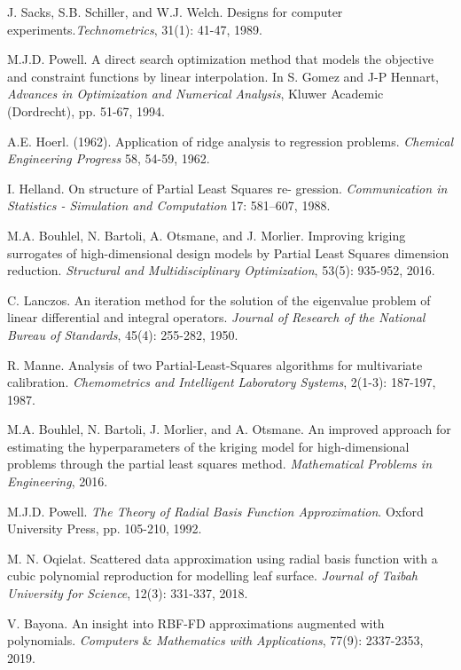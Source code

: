 J. Sacks, S.B. Schiller, and W.J. Welch. Designs for 
computer experiments.\textit{Technometrics}, 
31(1): 41-47, 1989.

M.J.D. Powell. A direct search optimization method that 
models the objective and constraint functions by linear 
interpolation. In S. Gomez and J-P Hennart, 
\textit{Advances in Optimization and Numerical Analysis},
Kluwer Academic (Dordrecht), pp. 51-67, 1994.

A.E. Hoerl. (1962). Application of ridge analysis to regression 
problems. \textit{Chemical Engineering Progress} 58, 54-59, 1962.

I. Helland. On structure of Partial Least Squares re-
gression. \textit{Communication in Statistics - Simulation 
and Computation} 17: 581–607, 1988.

M.A. Bouhlel, N. Bartoli, A. Otsmane, and J. Morlier. 
Improving kriging surrogates of high-dimensional design 
models by Partial Least Squares dimension reduction. 
\textit{Structural and Multidisciplinary Optimization}, 
53(5): 935-952, 2016.

C. Lanczos.  An iteration method for the solution of
the eigenvalue problem of linear differential and integral
operators. \textit{Journal of Research of the National 
Bureau of Standards}, 45(4): 255-282, 1950.

R. Manne.  Analysis of two Partial-Least-Squares 
algorithms for multivariate calibration. 
\textit{Chemometrics and Intelligent Laboratory Systems}, 
2(1-3): 187-197, 1987. 

M.A. Bouhlel, N. Bartoli, J. Morlier, and A. Otsmane. An 
improved approach for estimating the hyperparameters of 
the kriging model for high-dimensional problems through 
the partial least squares method. \textit{Mathematical 
Problems in Engineering}, 2016.

M.J.D. Powell. \textit{The Theory of Radial Basis Function 
Approximation}. Oxford University Press, pp. 105-210, 1992.

M. N. Oqielat. Scattered data approximation using radial 
basis function with a cubic polynomial reproduction for 
modelling leaf surface. \textit{Journal of Taibah 
University for Science}, 12(3): 331-337, 2018.  

V. Bayona. An insight into RBF-FD approximations augmented 
with polynomials. \textit{Computers} \& 
\textit{Mathematics with Applications}, 77(9): 2337-2353, 
2019. 

